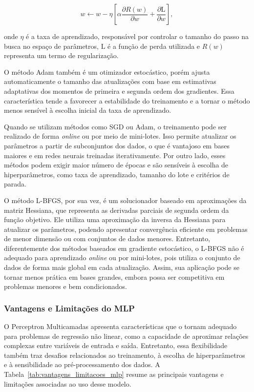 \[
w \leftarrow w - \eta \left[
\alpha \frac{\partial R(w)}{\partial w}
+
\frac{\partial \text{L}}{\partial w}
\right],
\]

onde \( \eta \) é a taxa de aprendizado, responsável por controlar o tamanho do passo na busca no espaço de parâmetros, \( \text{L} \) é a função de perda utilizada e \( R(w) \) representa um termo de regularização.

O método Adam também é um otimizador estocástico, porém ajusta automaticamente o tamanho das atualizações com base em estimativas adaptativas dos momentos de primeira e segunda ordem dos gradientes. Essa característica tende a favorecer a estabilidade do treinamento e a tornar o método menos sensível à escolha inicial da taxa de aprendizado.

Quando se utilizam métodos como SGD ou Adam, o treinamento pode ser realizado de forma \textit{online} ou por meio de mini-lotes. Isso permite atualizar os parâmetros a partir de subconjuntos dos dados, o que é vantajoso em bases maiores e em redes neurais treinadas iterativamente. Por outro lado, esses métodos podem exigir maior número de épocas e são sensíveis à escolha de hiperparâmetros, como taxa de aprendizado, tamanho do lote e critérios de parada.

O método L-BFGS, por sua vez, é um solucionador baseado em aproximações da matriz Hessiana, que representa as derivadas parciais de segunda ordem da função objetivo. Ele utiliza uma aproximação da inversa da Hessiana para atualizar os parâmetros, podendo apresentar convergência eficiente em problemas de menor dimensão ou com conjuntos de dados menores. Entretanto, diferentemente dos métodos baseados em gradiente estocástico, o L-BFGS não é adequado para aprendizado \textit{online} ou por mini-lotes, pois utiliza o conjunto de dados de forma mais global em cada atualização. Assim, sua aplicação pode se tornar menos prática em bases grandes, embora possa ser competitiva em problemas menores e bem condicionados.


\subsubsection{Vantagens e Limitações do MLP}

O Perceptron Multicamadas apresenta características que o tornam adequado para problemas de regressão não linear, como a capacidade de aproximar relações complexas entre variáveis de entrada e saída. Entretanto, essa flexibilidade também traz desafios relacionados ao treinamento, à escolha de hiperparâmetros e à sensibilidade ao pré-processamento dos dados. A Tabela~\ref{tab:vantagens_limitacoes_mlp} resume as principais vantagens e limitações associadas ao uso desse modelo.

